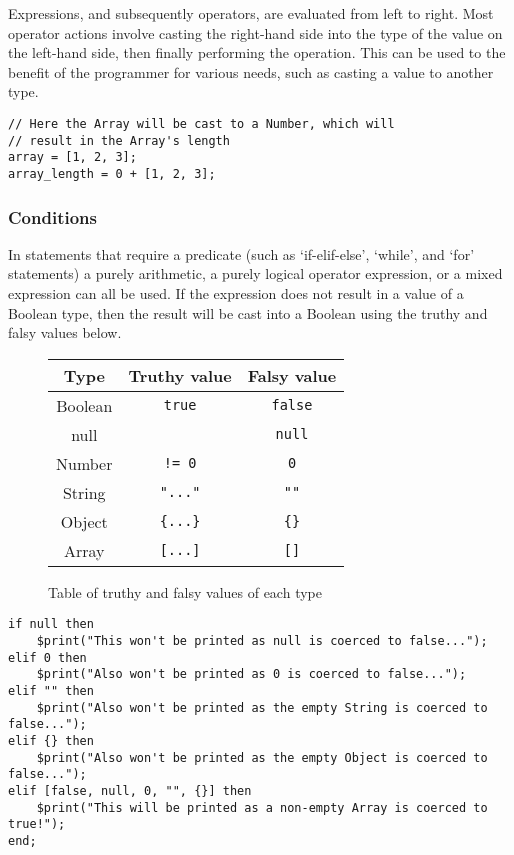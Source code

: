 Expressions, and subsequently operators, are evaluated from left to right. Most operator actions involve casting the right-hand side into the type of the value on the left-hand side, then finally performing the operation. This can be used to the benefit of the programmer for various needs, such as casting a value to another type.

\begin{verbatim}
// Here the Array will be cast to a Number, which will 
// result in the Array's length
array = [1, 2, 3];
array_length = 0 + [1, 2, 3];
\end{verbatim}

\subsubsection{Conditions}

In statements that require a predicate (such as `if-elif-else', `while', and `for' statements) a purely arithmetic, a purely logical operator expression, or a mixed expression can all be used. If the expression does not result in a value of a Boolean type, then the result will be cast into a Boolean using the truthy and falsy values below.

\begin{figure}[H]
    \begin{center}
        \begin{tabular}{| c | c | c |}
            \hline
            Type & Truthy value & Falsy value\\
            \hline
            Boolean & \verb|true| & \verb|false|\\
            \hline
            null & & \verb|null|\\
            \hline
            Number & \verb|!= 0| & \verb|0|\\
            \hline
            String & \verb|"..."| & \verb|""|\\
            \hline
            Object & \verb|{...}| & \verb|{}|\\
            \hline
            Array & \verb|[...]| & \verb|[]|\\
            \hline
        \end{tabular}
    \end{center}
    \caption{Table of truthy and falsy values of each type}
\end{figure}

\begin{verbatim}
if null then
    $print("This won't be printed as null is coerced to false...");
elif 0 then
    $print("Also won't be printed as 0 is coerced to false...");
elif "" then
    $print("Also won't be printed as the empty String is coerced to false...");
elif {} then
    $print("Also won't be printed as the empty Object is coerced to false...");
elif [false, null, 0, "", {}] then
    $print("This will be printed as a non-empty Array is coerced to true!");
end;
\end{verbatim}

